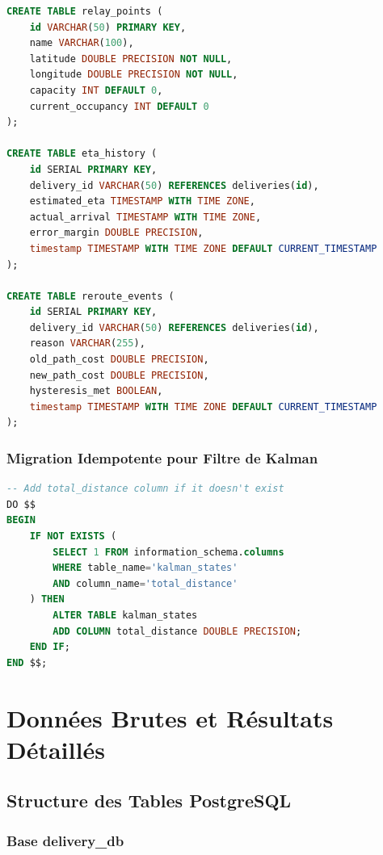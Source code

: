 \begin{lstlisting}[language=SQL, caption={Migration 006 - Tables métriques et événements}, label={lst:sql-metrics}]
CREATE TABLE relay_points (
    id VARCHAR(50) PRIMARY KEY,
    name VARCHAR(100),
    latitude DOUBLE PRECISION NOT NULL,
    longitude DOUBLE PRECISION NOT NULL,
    capacity INT DEFAULT 0,
    current_occupancy INT DEFAULT 0
);

CREATE TABLE eta_history (
    id SERIAL PRIMARY KEY,
    delivery_id VARCHAR(50) REFERENCES deliveries(id),
    estimated_eta TIMESTAMP WITH TIME ZONE,
    actual_arrival TIMESTAMP WITH TIME ZONE,
    error_margin DOUBLE PRECISION,
    timestamp TIMESTAMP WITH TIME ZONE DEFAULT CURRENT_TIMESTAMP
);

CREATE TABLE reroute_events (
    id SERIAL PRIMARY KEY,
    delivery_id VARCHAR(50) REFERENCES deliveries(id),
    reason VARCHAR(255),
    old_path_cost DOUBLE PRECISION,
    new_path_cost DOUBLE PRECISION,
    hysteresis_met BOOLEAN,
    timestamp TIMESTAMP WITH TIME ZONE DEFAULT CURRENT_TIMESTAMP
);
\end{lstlisting}

\subsection{Migration Idempotente pour Filtre de Kalman}

\begin{lstlisting}[language=SQL, caption={Migration 011 - Ajout colonne total\_distance}, label={lst:sql-kalman}]
-- Add total_distance column if it doesn't exist
DO $$
BEGIN
    IF NOT EXISTS (
        SELECT 1 FROM information_schema.columns
        WHERE table_name='kalman_states'
        AND column_name='total_distance'
    ) THEN
        ALTER TABLE kalman_states
        ADD COLUMN total_distance DOUBLE PRECISION;
    END IF;
END $$;
\end{lstlisting}

\newpage
\chapter{Données Brutes et Résultats Détaillés}

\section{Structure des Tables PostgreSQL}

\subsection{Base delivery\_db}

